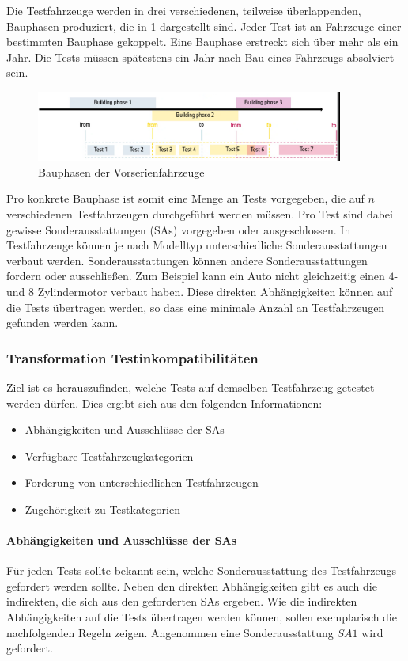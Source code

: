 Die Testfahrzeuge werden in drei verschiedenen, teilweise überlappenden,
Bauphasen produziert, die in \cref{fig:test_times} dargestellt sind.
Jeder Test ist an Fahrzeuge einer bestimmten Bauphase gekoppelt.
Eine Bauphase erstreckt sich über mehr als ein Jahr.
Die Tests müssen spätestens ein Jahr nach Bau eines
Fahrzeugs absolviert sein.
\begin{figure}[H]
    \centering
    \includegraphics[width=0.9\textwidth]{images/testfahrzeug_problem/test_times}
    \caption{Bauphasen der Vorserienfahrzeuge}
    \label{fig:test_times}
\end{figure}

Pro konkrete Bauphase ist somit eine Menge an Tests vorgegeben,
die auf $n$ verschiedenen Testfahrzeugen durchgeführt werden müssen.
Pro Test sind dabei gewisse Sonderausstattungen (SAs) vorgegeben oder ausgeschlossen.
In Testfahrzeuge können je nach Modelltyp unterschiedliche Sonderausstattungen
verbaut werden. Sonderausstattungen können andere Sonderausstattungen fordern
oder ausschließen. Zum Beispiel kann ein Auto nicht gleichzeitig einen $4$- und $8$
Zylindermotor verbaut haben. Diese direkten Abhängigkeiten können auf die Tests
übertragen werden, so dass eine minimale Anzahl an Testfahrzeugen gefunden werden kann.

\subsubsection{Transformation Testinkompatibilitäten}

Ziel ist es herauszufinden, welche Tests auf demselben Testfahrzeug getestet
werden dürfen. Dies ergibt sich aus den folgenden Informationen:

\begin{itemize}
    \item Abhängigkeiten und Ausschlüsse der SAs
    \item Verfügbare Testfahrzeugkategorien
    \item Forderung von unterschiedlichen Testfahrzeugen
    \item Zugehörigkeit zu Testkategorien
\end{itemize}

\paragraph{Abhängigkeiten und Ausschlüsse der SAs}
Für jeden Tests sollte bekannt sein, welche Sonderausstattung des Testfahrzeugs
gefordert werden sollte. Neben den direkten Abhängigkeiten gibt es auch die
indirekten, die sich aus den geforderten SAs ergeben. Wie die indirekten
Abhängigkeiten auf die Tests übertragen werden können, sollen exemplarisch die
nachfolgenden Regeln zeigen. Angenommen eine Sonderausstattung $SA1$ wird gefordert.

